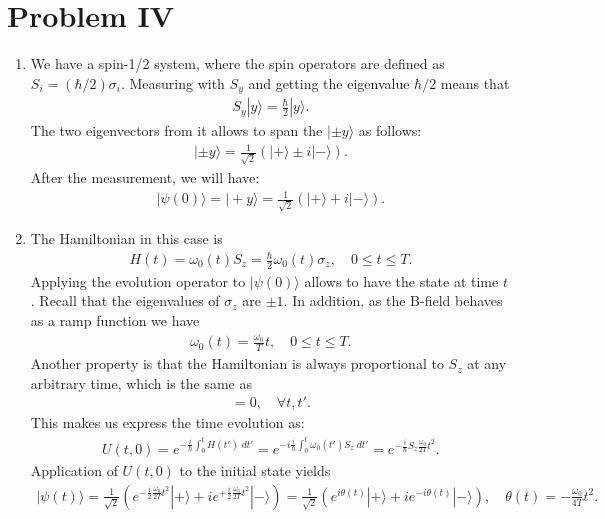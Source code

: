 \documentclass[letterpaper,11pt,twoside]{article}
\newcommand{\ket}[1]{|#1\rangle}
\begin{document}
\section*{Problem IV}
\begin{enumerate}[itemsep=0pt,topsep=0pt,label=\alph*)]
  \item We have a spin-1/2 system, where the spin operators are defined as $S_i=(\hbar/2)\sigma_i$. Measuring with $S_y$ and getting the eigenvalue $\hbar/2$ means that 
  \begin{align*}
    S_y\ket{y}=\frac{\hbar}{2}\ket{y}.
  \end{align*}
  The two eigenvectors from it allows to span the $\ket{\pm y}$ as follows:
  \begin{align*}
    \ket{\pm y}=\frac{1}{\sqrt{2}}(\ket{+}\pm i\ket{-}).
  \end{align*}
  After the measurement, we will have:
  \begin{align*}
    \ket{\psi(0)}=\ket{+y}=\frac{1}{\sqrt{2}}(\ket{+}+i\ket{-}).
  \end{align*}
  \item The Hamiltonian in this case is 
  \begin{align*}
    H(t)=\omega_0(t)S_z=\frac{\hbar}{2}\omega_0(t)\sigma_z,\quad0\leq t\leq T.
  \end{align*}
  Applying the evolution operator to $\ket{\psi(0)}$ allows to have the state at time $t$. Recall that the eigenvalues of $\sigma_z$ are $\pm1$.
  In addition, as the B-field behaves as a ramp function we have 
  \begin{align*}
    \omega_0(t)=\frac{\omega_0}{T}t,\quad0\leq t\leq T.  
  \end{align*}
  Another property is that the Hamiltonian is always proportional to $S_z$ at any arbitrary time, which is the same as 
  \begin{align*}
    [H(t),H(t')]=0,\quad\forall t,t'.
  \end{align*}
  This makes us express the time evolution as:
  \begin{align*}
    U(t,0)=e^{-\frac{i}{\hbar}\int_0^tH(t')\;dt'}=e^{-i\frac{i}{\hbar}\int_0^t\omega_0(t')S_z\;dt'}=e^{-\frac{i}{\hbar}S_z\frac{\omega_0}{2T}t^2}.
  \end{align*}
  Application of $U(t,0)$ to the initial state yields
  \begin{align*}
    \ket{\psi(t)}=\frac{1}{\sqrt{2}}\left(e^{-\frac{i}{2}\frac{\omega_0}{2T}t^2}\ket{+}+ie^{+\frac{i}{2}\frac{\omega_0}{2T}t^2}\ket{-}\right)=\frac{1}{\sqrt{2}}(e^{i\theta(t)}\ket{+}+ie^{-i\theta(t)}\ket{-}),\quad \theta(t)=-\frac{\omega_0}{4T}t^2.

\end{align*}
\end{enumerate}
\end{document}
